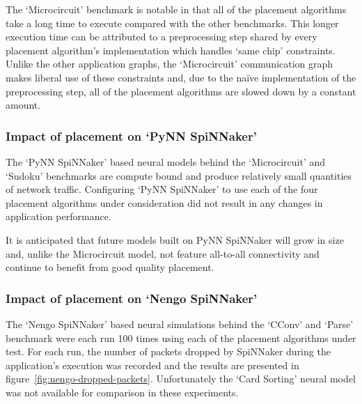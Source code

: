 				The `Microcircuit' benchmark is notable in that all of the placement
				algorithms take a long time to execute compared with the other
				benchmarks. This longer execution time can be attributed to a
				preprocessing step shared by every placement algorithm's implementation
				which handles `same chip' constraints. Unlike the other application
				graphs, the `Microcircuit' communication graph makes liberal use of
				these constraints and, due to the na\"ive implementation of the
				preprocessing step, all of the placement algorithms are slowed down by
				a constant amount.
			
			\subsubsection{Impact of placement on `PyNN SpiNNaker'}
				
				The `PyNN SpiNNaker' based neural models behind the `Microcircuit' and
				`Sudoku' benchmarks are compute bound and produce relatively small
				quantities of network traffic. Configuring `PyNN SpiNNaker' to use each
				of the four placement algorithms under consideration did not result in
				any changes in application performance.
				
				It is anticipated that future models built on PyNN SpiNNaker will grow
				in size and, unlike the Microcircuit model, not feature all-to-all
				connectivity and continue to benefit from good quality placement.
			
			\subsubsection{Impact of placement on `Nengo SpiNNaker'}
				
				The `Nengo SpiNNaker' based neural simulations behind the `CConv' and
				`Parse' benchmark were each run \num{100} times using each of the
				placement algorithms under test. For each run, the number of packets
				dropped by SpiNNaker during the application's execution was recorded
				and the results are presented in
				figure~\ref{fig:nengo-dropped-packets}. Unfortunately the `Card
				Sorting' neural model was not available for comparison in these
				experiments.
				

